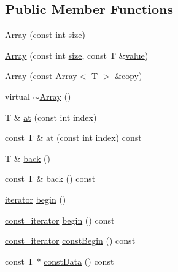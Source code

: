 \subsection*{Public Member Functions}
\begin{DoxyCompactItemize}
\item 
\hyperlink{classprism_1_1containers_1_1_array_ac1208a0e8b7fc1e6cb25a6af63931fe8}{Array} (const int \hyperlink{classprism_1_1containers_1_1_array_a9f3a6d530825e137771fef3a317017fb}{size})
\item 
\hyperlink{classprism_1_1containers_1_1_array_af8931de73694333e94471f47998b9c8a}{Array} (const int \hyperlink{classprism_1_1containers_1_1_array_a9f3a6d530825e137771fef3a317017fb}{size}, const T \&\hyperlink{classprism_1_1containers_1_1_array_a6fac700f89e79bd35f5c431dda5ad30f}{value})
\item 
\hyperlink{classprism_1_1containers_1_1_array_af3781ba5f85a200bacbe4f3619c05d68}{Array} (const \hyperlink{classprism_1_1containers_1_1_array}{Array}$<$ T $>$ \&copy)
\item 
virtual \hyperlink{classprism_1_1containers_1_1_array_a7baa8d313f0d531a6bfb644069380c6b}{$\sim$\+Array} ()
\item 
T \& \hyperlink{classprism_1_1containers_1_1_array_aeebe2b8e0e68b19fc7872d3e877ae3f4}{at} (const int index)
\item 
const T \& \hyperlink{classprism_1_1containers_1_1_array_a63758592be8559673370f9123d4790af}{at} (const int index) const 
\item 
T \& \hyperlink{classprism_1_1containers_1_1_array_ab38487fec3433f0ef41fec00dd21ff58}{back} ()
\item 
const T \& \hyperlink{classprism_1_1containers_1_1_array_a53aaf27dd328aa4533b66b5b607e2758}{back} () const 
\item 
\hyperlink{classprism_1_1containers_1_1_array_af5e3ad470f2bb2d24f0f98e12e11a60b}{iterator} \hyperlink{classprism_1_1containers_1_1_array_aac709781c2aaf303b6c0a49a152b0e71}{begin} ()
\item 
\hyperlink{classprism_1_1containers_1_1_array_a9cf61ea4548f20cae51d2ddcc83f9a16}{const\+\_\+iterator} \hyperlink{classprism_1_1containers_1_1_array_adb5c8e59c0cec83e0a73fe1e76cab29f}{begin} () const 
\item 
\hyperlink{classprism_1_1containers_1_1_array_a9cf61ea4548f20cae51d2ddcc83f9a16}{const\+\_\+iterator} \hyperlink{classprism_1_1containers_1_1_array_ac0a6657c6428640c26acb6e8bc86bccb}{const\+Begin} () const 
\item 
const T $\ast$ \hyperlink{classprism_1_1containers_1_1_array_afe3570ebc6d4e4e9aaa09715a5bf1b16}{const\+Data} () const 

\end{DoxyCompactItemize}
